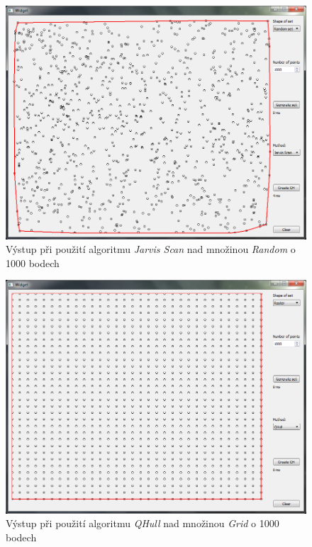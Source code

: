 \documentclass[a4paper, 12pt]{article}
\begin{document}
\begin{figure}[h!]
	\centering
	\includegraphics[width=11.5cm]{./pictures/app_random_jarvis.png}
	\caption{Výstup při použití algoritmu \textit{Jarvis Scan} nad množinou \textit{Random} o 1000 bodech}
\end{figure}

\begin{figure}[h!]
	\centering
	\includegraphics[width=13cm]{./pictures/app_raster_qhull.png}
	\caption{Výstup při použití algoritmu \textit{QHull} nad množinou \textit{Grid} o 1000 bodech}
\end{figure}
~
\end{document}
